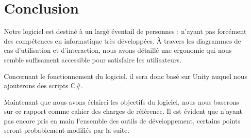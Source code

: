 \section{Conclusion}
Notre logiciel est destiné à un largé éventail de personnes ; n'ayant pas forcément des compétences en informatique très développées.
\`A travers les diagrammes de cas d'utilisation et d'interaction, nous avons détaillé une ergonomie qui nous semble suffisament accessible pour satisfaire les utilisateurs.

Concernant le fonctionnement du logiciel, il sera donc basé sur Unity auquel nous ajouterons des scripts C\#.

Maintenant que nous avons éclairci les objectifs du logiciel, nous nous baserons sur ce rapport comme cahier des charges de référence. Il est évident que n'ayant pas encore pris en main l'ensemble des outils de développement, certains points seront probablement modifiés par la suite.
